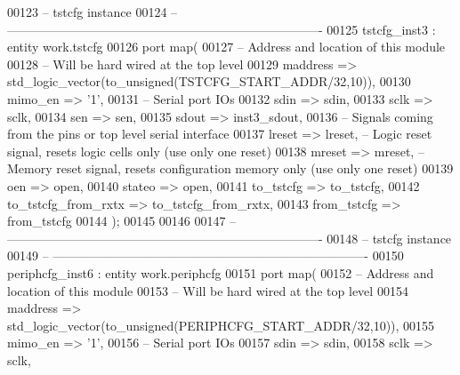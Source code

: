 \begin{DoxyCode}
00123 \textcolor{keyword}{-- tstcfg instance}
00124 \textcolor{keyword}{-- ----------------------------------------------------------------------------    }
00125    tstcfg\_inst3 : \textcolor{keywordflow}{entity} work.tstcfg
00126    \textcolor{keywordflow}{port} \textcolor{keywordflow}{map}(
00127 \textcolor{keyword}{      -- Address and location of this module}
00128 \textcolor{keyword}{      -- Will be hard wired at the top level}
00129       maddress             => \textcolor{comment}{std\_logic\_vector}\textcolor{vhdlchar}{(}to\_unsigned\textcolor{vhdlchar}{(}TSTCFG\_START\_ADDR/32,\textcolor{vhdllogic}{10}\textcolor{vhdlchar}{)}\textcolor{vhdlchar}{)},
00130       mimo_en              => '1',   
00131 \textcolor{keyword}{      -- Serial port IOs}
00132       sdin                 => sdin,
00133       sclk                 => sclk,
00134       sen                  => sen,
00135       sdout                => inst3_sdout,  
00136 \textcolor{keyword}{      -- Signals coming from the pins or top level serial interface}
00137       lreset               => lreset,\textcolor{keyword}{   -- Logic reset signal, resets logic cells only  (use only one
       reset)}
00138       mreset               => mreset,\textcolor{keyword}{   -- Memory reset signal, resets configuration memory only (use only
       one reset)      }
00139       oen                  => \textcolor{keywordflow}{open},
00140       stateo               => \textcolor{keywordflow}{open},    
00141       to_tstcfg            => to_tstcfg,
00142       to_tstcfg_from_rxtx  => to_tstcfg_from_rxtx,
00143       from_tstcfg          => from_tstcfg
00144    \textcolor{vhdlchar}{)};
00145 
00146    
00147 \textcolor{keyword}{-- ----------------------------------------------------------------------------}
00148 \textcolor{keyword}{-- tstcfg instance}
00149 \textcolor{keyword}{-- ----------------------------------------------------------------------------    }
00150    periphcfg\_inst6 : \textcolor{keywordflow}{entity} work.periphcfg
00151    \textcolor{keywordflow}{port} \textcolor{keywordflow}{map}(
00152 \textcolor{keyword}{      -- Address and location of this module}
00153 \textcolor{keyword}{      -- Will be hard wired at the top level}
00154       maddress    => \textcolor{comment}{std\_logic\_vector}\textcolor{vhdlchar}{(}to\_unsigned\textcolor{vhdlchar}{(}PERIPHCFG\_START\_ADDR/32,\textcolor{vhdllogic}{10}\textcolor{vhdlchar}{)}\textcolor{vhdlchar}{)},
00155       mimo_en     => '1',   
00156 \textcolor{keyword}{      -- Serial port IOs}
00157       sdin        => sdin,
00158       sclk        => sclk,

\end{DoxyCode}
